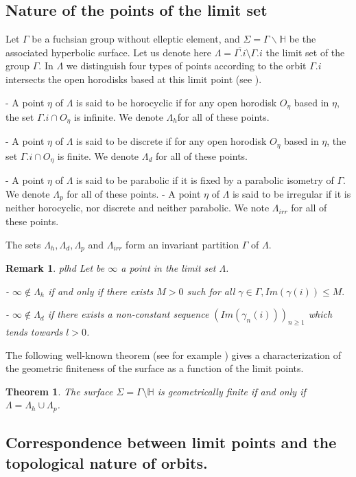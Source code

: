 \documentclass[11pt]{amsart}
\def\H{\mathbb H}
\newtheorem{thm}{Theorem}[section]
\newtheorem{rmk}{Remark}[section]
\begin{document}
\subsection{Nature of the points of the limit set}
Let $\Gamma$ be a fuchsian group without elleptic element, and    $\Sigma=\Gamma\backslash\mathbb{H}$ be the associated hyperbolic surface. Let us denote here 
 $\Lambda=\overline{\Gamma.i}\setminus\Gamma.i$ the limit set of the group $\Gamma$. In $\Lambda$ we distinguish four types of points according to the orbit $\Gamma.i$ intersects the open horodisks based at this limit point (see \textbf{\cite{DalboStarkov2000}}).


- A point $\eta$ of $\Lambda$ is said to be horocyclic if for any open horodisk $O_{\eta}$ based in $\eta$, the set $\Gamma.i \cap O_{\eta}$ is infinite. We denote $\Lambda_h $for all of these points.

- A point $\eta$ of $\Lambda$ is said to be discrete if for any open horodisk $O_{\eta}$ based in $\eta$, the set $\Gamma.i \cap O_{\eta}$ is finite. We denote $\Lambda_d $ for all of these points.

- A point $\eta$ of $\Lambda$ is said to be parabolic if it is fixed by a parabolic isometry of $\Gamma$. We denote $\Lambda_p$ for all of these points.
- A point $\eta$ of $\Lambda$ is said to be irregular if it is neither horocyclic, nor discrete and neither
parabolic. We note $\Lambda_{irr}$ for all of these points.

The sets $\Lambda_h, \Lambda_d, \Lambda_p$ and $\Lambda_{irr}$ form an invariant partition $\Gamma$ of $\Lambda$.

\begin{rmk}{plhd}
Let be $\infty$ a point in the limit set $\Lambda$.


- $\infty\notin\Lambda_h$ if and only if there exists $M>0$ such for all $\gamma\in\Gamma, Im(\gamma(i))\leq M.$

- $\infty\notin\Lambda_d$  if there exists a non-constant sequence $(Im(\gamma_n(i)))_{n\geq 1}$ which tends towards $l>0$.
\end{rmk}
The following well-known theorem (see for example \textbf{\cite{DalboStarkov2000}}) gives a characterization of the geometric finiteness of the surface as a function of the limit points.
\begin{thm}
The surface $\Sigma=\Gamma\setminus\H$ is geometrically finite if and only if $\Lambda= \Lambda_h\cup\Lambda_p$. 
\end{thm}
\subsection{Correspondence between limit points and the topological nature of orbits.}
\end{document}
